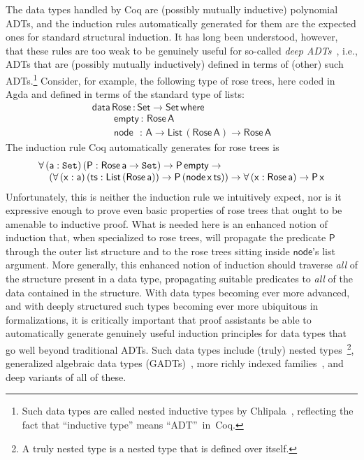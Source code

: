 \documentclass[9pt]{entcs}
\newcommand{\set}{\mathtt{Set}}
\begin{document}
The data types handled by Coq are (possibly mutually inductive)
polynomial ADTs, and the induction rules automatically generated for
them are the expected ones for standard structural induction. It has
long been understood, however, that these rules are too weak to be
genuinely useful for so-called {\em deep ADTs}~\cite{jp20}, i.e., ADTs
that are (possibly mutually inductively) defined in terms of (other)
such ADTs.\footnote{Such data types are called nested inductive types
  by Chlipala~\cite{chl}, reflecting the fact that ``inductive type''
  means ``ADT''~in~Coq.} Consider, for example, the following type of
rose trees, here coded in Agda and defined in terms of the standard
type of lists:
\[\begin{array}{l}
\mathsf{data\, Rose\, : Set \to Set\,where}\\
\mathsf{\;\;\;\;\;\;\;\;empty\, :\, Rose\,A}\\
\mathsf{\;\;\;\;\;\;\;\;node\,\,\,\, :\, A \to List\,(Rose\,A) \to Rose\,A} 
\end{array}\]
\noindent
The induction rule Coq automatically generates for rose trees is
\[\begin{array}{l}
\mathsf{\forall\, (a : \set)\,(P : Rose\,a \to \set) \to P\,empty \to}\\
\mathsf{\hspace*{0.15in}
 (\forall\, (x : a)\,(ts :
  List\,(Rose\,a)) \to P\,(node\,x\,ts)) \to 
  \forall \,(x : Rose\,a) \to P\,x}
\end{array}\]
\noindent
Unfortunately, this is neither the induction rule we intuitively
expect, nor is it expressive enough to prove even basic properties of
rose trees that ought to be amenable to inductive proof. What is
needed here is an enhanced notion of induction that, when specialized
to rose trees, will propagate the predicate $\mathsf{P}$ through the
outer list structure and to the rose trees sitting inside
$\mathsf{node}$'s list argument. More generally, this enhanced notion
of induction should traverse {\em all} of the structure present in a
data type, propagating suitable predicates to {\em all} of the data
contained in the structure. With data types becoming ever more
advanced, and with deeply structured such types becoming ever more
ubiquitous in formalizations, it is critically important that proof
assistants
be able to automatically generate genuinely useful induction
principles for data types that go well beyond traditional ADTs. Such
data types include (truly) nested types~\cite{bm98}\footnote{A truly
  nested type is a nested type that is defined over itself.},
generalized algebraic data types
(GADTs)~\cite{ch03,pvww06,sp04,xcc03}, more richly indexed
families~\cite{ch88}, and deep variants of all of these.
\end{document}
